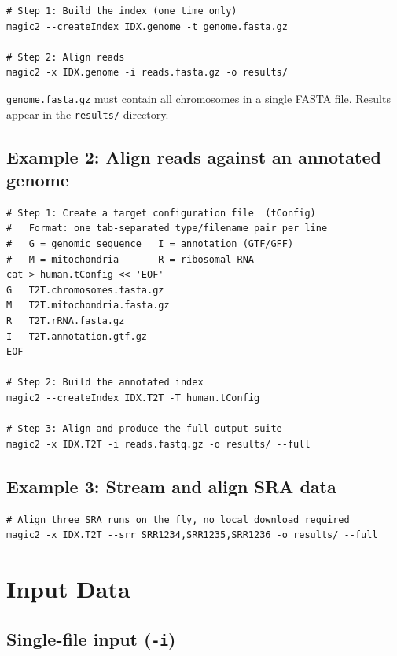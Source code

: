\documentclass[11pt]{article}
\newcommand{\code}[1]{\texttt{#1}}
\begin{document}
\begin{lstlisting}
# Step 1: Build the index (one time only)
magic2 --createIndex IDX.genome -t genome.fasta.gz

# Step 2: Align reads
magic2 -x IDX.genome -i reads.fasta.gz -o results/
\end{lstlisting}

\code{genome.fasta.gz} must contain all chromosomes in a single FASTA
file.  Results appear in the \code{results/} directory.

\subsection{Example 2: Align reads against an annotated genome}

\begin{lstlisting}
# Step 1: Create a target configuration file  (tConfig)
#   Format: one tab-separated type/filename pair per line
#   G = genomic sequence   I = annotation (GTF/GFF)
#   M = mitochondria       R = ribosomal RNA
cat > human.tConfig << 'EOF'
G	T2T.chromosomes.fasta.gz
M	T2T.mitochondria.fasta.gz
R	T2T.rRNA.fasta.gz
I	T2T.annotation.gtf.gz
EOF

# Step 2: Build the annotated index
magic2 --createIndex IDX.T2T -T human.tConfig

# Step 3: Align and produce the full output suite
magic2 -x IDX.T2T -i reads.fastq.gz -o results/ --full
\end{lstlisting}

\subsection{Example 3: Stream and align SRA data}

\begin{lstlisting}
# Align three SRA runs on the fly, no local download required
magic2 -x IDX.T2T --srr SRR1234,SRR1235,SRR1236 -o results/ --full
\end{lstlisting}

\section{Input Data}

\subsection{Single-file input (\code{-i})}
\end{document}

